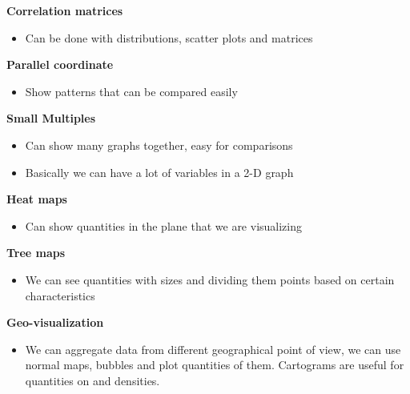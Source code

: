 \vspace{10pt}

\textbf{Correlation matrices}
\begin{itemize}
    \item Can be done with distributions, scatter plots and matrices
\end{itemize}

\textbf{Parallel coordinate}
\begin{itemize}
    \item Show patterns that can be compared easily
\end{itemize}


\vspace{10pt}

\textbf{Small Multiples}

\begin{itemize}

\item Can show many graphs together, easy for comparisons
   
\item Basically we can have a lot of variables in a 2-D graph

\end{itemize}

\vspace{10pt}

\textbf{Heat maps}
\begin{itemize}
    \item Can show quantities in the plane that we are visualizing
\end{itemize}

\vspace{10pt}

\textbf{Tree maps}
\begin{itemize}
    \item We can see quantities with sizes and dividing them points based on certain characteristics
\end{itemize}

\vspace{10pt}

\textbf{Geo-visualization}

\begin{itemize}
    \item We can aggregate data from different geographical point of view, we can use normal maps, bubbles and plot quantities of them. Cartograms are useful for quantities on and densities.
\end{itemize}

